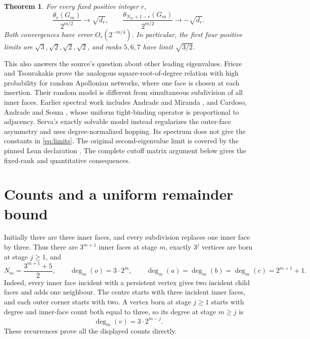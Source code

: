 \documentclass[11pt]{article}
\newtheorem{theorem}{Theorem}
\begin{document}
\begin{theorem}\label{thm:limits}
For every fixed positive integer $r$,
\begin{equation}\label{eq:limits}
\frac{\theta_r(G_m)}{2^{m/2}}\longrightarrow\sqrt{d_r},
\qquad
\frac{\theta_{N_m+1-r}(G_m)}{2^{m/2}}\longrightarrow-\sqrt{d_r}.
\end{equation}
Both convergences have error $O_r(2^{-m/4})$.
In particular, the first four positive limits are
$\sqrt3,\sqrt2,\sqrt2,\sqrt2$, and ranks $5,6,7$ have limit $\sqrt{3/2}$.
\end{theorem}

This also answers the source's question about other leading eigenvalues.
Frieze and Tsourakakis \cite[Theorem 2]{frieze} prove the analogous
square-root-of-degree relation with high probability for random Apollonian
networks, where one face is chosen at each insertion. Their random model
is different from simultaneous subdivision of all inner faces.
Earlier spectral work includes Andrade and Miranda \cite{andrade}, and
Cardoso, Andrade and Souza \cite{cardoso}, whose uniform tight-binding
operator is proportional to adjacency. Serva's exactly solvable model
\cite{serva} instead regularizes the outer-face asymmetry and uses
degree-normalized hopping. Its spectrum does not give the constants in
\eqref{eq:limits}. The original second-eigenvalue limit is covered by
the pinned Lean declaration \cite{source}. The complete cutoff matrix
argument below gives the fixed-rank and quantitative consequences.

\section{Counts and a uniform remainder bound}
Initially there are three inner faces, and every subdivision replaces one
inner face by three. Thus there are $3^{m+1}$ inner faces at stage $m$,
exactly $3^j$ vertices are born at stage $j\ge1$, and
\begin{equation}\label{eq:degrees}
N_m=\frac{3^{m+1}+5}{2},\qquad
\deg_m(o)=3\cdot2^m,\qquad
\deg_m(a)=\deg_m(b)=\deg_m(c)=2^{m+1}+1.
\end{equation}
Indeed, every inner face incident with a persistent vertex gives two
incident child faces and adds one neighbour. The centre starts with three
incident inner faces, and each outer corner starts with two. A vertex
born at stage $j\ge1$ starts with degree and inner-face count both equal
to three, so its degree at stage $m\ge j$ is
\begin{equation}\label{eq:innerdegree}
\deg_m(v)=3\cdot2^{m-j}.
\end{equation}
These recurrences prove all the displayed counts directly.
\end{document}

